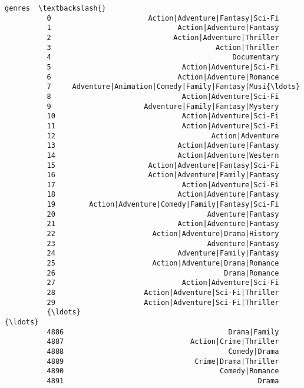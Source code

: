 \documentclass[11pt]{article}
\begin{document}
\begin{Verbatim}[commandchars=\\\{\}]
                                                           genres  \textbackslash{}
          0                       Action|Adventure|Fantasy|Sci-Fi   
          1                              Action|Adventure|Fantasy   
          2                             Action|Adventure|Thriller   
          3                                       Action|Thriller   
          4                                           Documentary   
          5                               Action|Adventure|Sci-Fi   
          6                              Action|Adventure|Romance   
          7     Adventure|Animation|Comedy|Family|Fantasy|Musi{\ldots}   
          8                               Action|Adventure|Sci-Fi   
          9                      Adventure|Family|Fantasy|Mystery   
          10                              Action|Adventure|Sci-Fi   
          11                              Action|Adventure|Sci-Fi   
          12                                     Action|Adventure   
          13                             Action|Adventure|Fantasy   
          14                             Action|Adventure|Western   
          15                      Action|Adventure|Fantasy|Sci-Fi   
          16                      Action|Adventure|Family|Fantasy   
          17                              Action|Adventure|Sci-Fi   
          18                             Action|Adventure|Fantasy   
          19        Action|Adventure|Comedy|Family|Fantasy|Sci-Fi   
          20                                    Adventure|Fantasy   
          21                             Action|Adventure|Fantasy   
          22                       Action|Adventure|Drama|History   
          23                                    Adventure|Fantasy   
          24                             Adventure|Family|Fantasy   
          25                       Action|Adventure|Drama|Romance   
          26                                        Drama|Romance   
          27                              Action|Adventure|Sci-Fi   
          28                     Action|Adventure|Sci-Fi|Thriller   
          29                     Action|Adventure|Sci-Fi|Thriller   
          {\ldots}                                                 {\ldots}   
          4886                                       Drama|Family   
          4887                              Action|Crime|Thriller   
          4888                                       Comedy|Drama   
          4889                               Crime|Drama|Thriller   
          4890                                     Comedy|Romance   
          4891                                              Drama   

\end{Verbatim}
\end{document}
